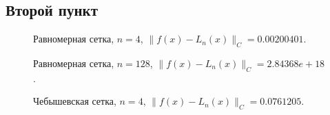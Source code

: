 \documentclass[12pt, a4paper]{article}
\begin{document}
\pagebreak

\subsection{Второй пункт}

\begin{figure}[h]
    \caption{Равномерная сетка, $n = 4$, $ \| f(x) - L_n(x)  \|_C = 0.00200401 $.}
\end{figure}

\begin{figure}[h]
    \caption{Равномерная сетка, $n = 128$, $ \| f(x) - L_n(x)  \|_C = 2.84368e+18 $.}
\end{figure}

\pagebreak


\begin{figure}[h]
    \caption{Чебышевская сетка, $n = 4$, $ \| f(x) - L_n(x)  \|_C = 0.0761205 $.}
\end{figure}
\end{document}
